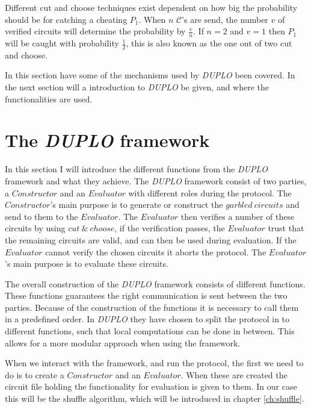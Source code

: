 \documentclass[twoside,11pt,openright]{report}
\newcommand{\DUPLO}{\textit{DUPLO} }
\begin{document}
Different cut and choose techniques exist dependent on how big the probability should be for catching a cheating $P_1$. When $n$ $\mathcal{C}$'s are send, the number $v$ of verified circuits will determine the probability by $\frac{v}{n}$. If $n=2$ and $v=1$ then $P_1$ will be caught with probability $\frac{1}{2}$, this is also known as the one out of two cut and choose.

\bigskip


In this section have some of the mechanisms used by \DUPLO been covered. In the next section will a introduction to \DUPLO be given, and where the functionalities are used.

\section{The \DUPLO framework}
\label{sec:duplo_framework}
In this section I will introduce the different functions from the \DUPLO framework and what they achieve. The \DUPLO framework consist of two parties, a $Constructor$ and an $Evaluator$ with different roles during the protocol. The $Constructor$'s main purpose is to generate or construct the $garbled~circuits$ and send to them to the $Evaluator$. The $Evaluator$ then verifies a number of these circuits by using $cut~\&~choose$, if the verification passes, the $Evaluator$ trust that the remaining circuits are valid, and can then be used during evaluation. If the $Evaluator$ cannot verify the chosen circuits it aborts the protocol. The $Evaluator$'s main purpose is to evaluate these circuits.

The overall construction of the \DUPLO framework consists of different functions. These functions guarantees the right communication is sent between the two parties. Because of the construction of the functions it is necessary to call them in a predefined order. In \DUPLO they have chosen to split the protocol in to different functions, such that local computations can be done in between. This allows for a more modular approach when using the framework.

\bigskip

When we interact with the framework, and run the protocol, the first we need to do is to create a $Constructor$ and an $Evaluator$. When these are created the circuit file holding the functionality for evaluation is given to them. In our case this will be the shuffle algorithm, which will be introduced in chapter \ref{ch:shuffle}.
\end{document}
